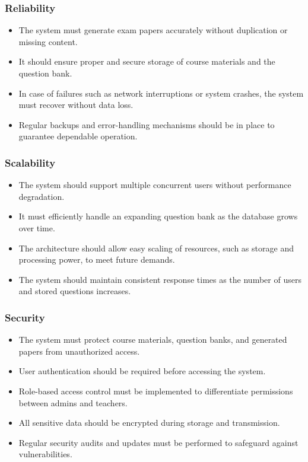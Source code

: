 \documentclass[12pt]{article}
\begin{document}
	\subsubsection{Reliability}
	\begin{itemize}
		\item The system must generate exam papers accurately without duplication or missing content.
		\item It should ensure proper and secure storage of course materials and the question bank.
		\item In case of failures such as network interruptions or system crashes, the system must recover without data loss.
		\item Regular backups and error-handling mechanisms should be in place to guarantee dependable operation.
	\end{itemize}
	
	\subsubsection{Scalability}
	\begin{itemize}
		\item The system should support multiple concurrent users without performance degradation.
		\item It must efficiently handle an expanding question bank as the database grows over time.
		\item The architecture should allow easy scaling of resources, such as storage and processing power, to meet future demands.
		\item The system should maintain consistent response times as the number of users and stored questions increases.
	\end{itemize}
	
	\subsubsection{Security}
	\begin{itemize}
		\item The system must protect course materials, question banks, and generated papers from unauthorized access.
		\item User authentication should be required before accessing the system.
		\item Role-based access control must be implemented to differentiate permissions between admins and teachers.
		\item All sensitive data should be encrypted during storage and transmission.
		\item Regular security audits and updates must be performed to safeguard against vulnerabilities.
	\end{itemize}
	
\end{document}

